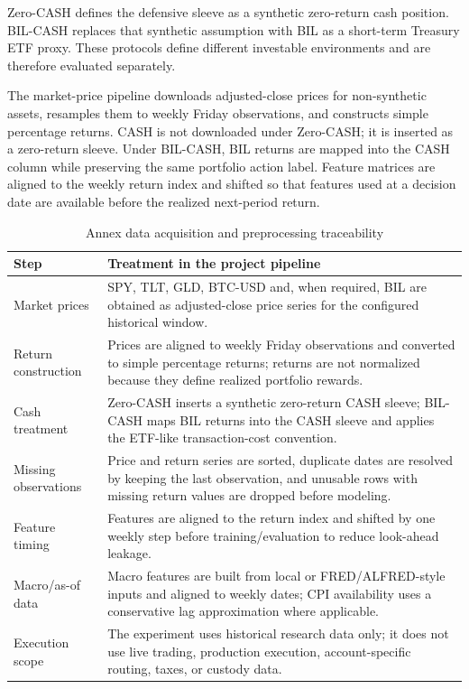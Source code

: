 \documentclass[12pt]{article}
\begin{document}
Zero-CASH defines the defensive sleeve as a synthetic zero-return cash position. BIL-CASH replaces that synthetic assumption with BIL as a short-term Treasury ETF proxy. These protocols define different investable environments and are therefore evaluated separately.

The market-price pipeline downloads adjusted-close prices for non-synthetic assets, resamples them to weekly Friday observations, and constructs simple percentage returns. CASH is not downloaded under Zero-CASH; it is inserted as a zero-return sleeve. Under BIL-CASH, BIL returns are mapped into the CASH column while preserving the same portfolio action label. Feature matrices are aligned to the weekly return index and shifted so that features used at a decision date are available before the realized next-period return.

\begin{table}[H]
\centering
\caption{Annex data acquisition and preprocessing traceability}
\scriptsize
\begin{tabularx}{\textwidth}{L{0.28\textwidth}Y}
\toprule
\textbf{Step} & \textbf{Treatment in the project pipeline} \\
\midrule
Market prices & SPY, TLT, GLD, BTC-USD and, when required, BIL are obtained as adjusted-close price series for the configured historical window. \\
Return construction & Prices are aligned to weekly Friday observations and converted to simple percentage returns; returns are not normalized because they define realized portfolio rewards. \\
Cash treatment & Zero-CASH inserts a synthetic zero-return CASH sleeve; BIL-CASH maps BIL returns into the CASH sleeve and applies the ETF-like transaction-cost convention. \\
Missing observations & Price and return series are sorted, duplicate dates are resolved by keeping the last observation, and unusable rows with missing return values are dropped before modeling. \\
Feature timing & Features are aligned to the return index and shifted by one weekly step before training/evaluation to reduce look-ahead leakage. \\
Macro/as-of data & Macro features are built from local or FRED/ALFRED-style inputs and aligned to weekly dates; CPI availability uses a conservative lag approximation where applicable. \\
Execution scope & The experiment uses historical research data only; it does not use live trading, production execution, account-specific routing, taxes, or custody data. \\
\bottomrule
\end{tabularx}
\end{table}
\end{document}
